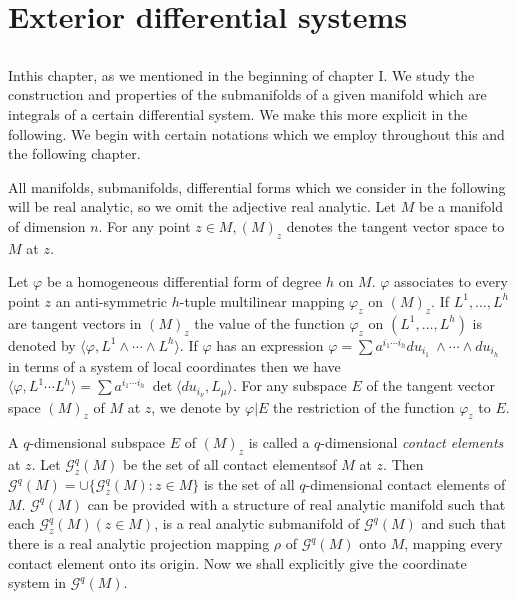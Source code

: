 
\chapter{Exterior differential systems}\label{chap2} %

\section{}\label{chap2:sec2.1} %

In\pageoriginale this chapter,  as we mentioned in the beginning of chapter I. We
study the construction and properties of the submanifolds of a given
manifold which are integrals of a certain differential system. We
make this more explicit in the following. We begin with certain
notations which we employ throughout this and the following chapter. 

All manifolds,  submanifolds,  differential forms which we consider in
the following will be real analytic,  so we omit the adjective real
analytic. Let $M$ be a manifold of dimension $n$. For any point $z \in
M,  (M)_z$ denotes the tangent vector space to $M$ at $z$. 

Let $\varphi$ be a homogeneous differential form of degree $h$ on
$M$. $\varphi$ associates to every point $z$ an anti-symmetric $h$-tuple
multilinear mapping $\varphi_z$ on $(M)_z$. If $L^1,  \ldots,  L^h$
are tangent vectors in $(M)_z$ the value of the function $\varphi_z$
on $(L^1,  \ldots,  L^h)$ is denoted by $\langle \varphi,  L^1 \wedge
\cdots \wedge L^h \rangle$. If $\varphi$ has an expression $\varphi =
\sum a^{i_1 \cdots i_h} du_{i_1} ~ \wedge \cdots \wedge du_{i_h}$ in
terms of a system of local coordinates then we have $\langle \varphi,
L^1 \cdots L^h \rangle = \sum a^{i_1 \cdots i_h} ~ \det \langle
du_{i_\nu},  L_\mu \rangle$. For any subspace $E$ of the tangent
vector space $(M)_z$ of $M$ at $z$,  we denote by $\varphi | E$ the
restriction of the function $\varphi_z$ to $E$. 

A $q$-dimensional subspace $E$ of $(M)_z$ is called a $q$-dimensional
\textit{contact elements} at $z$. Let $\mathscr{G}^q_z (M)$ be the set
of all contact elements\pageoriginale of $M$ at $z$. Then $\mathscr{G}^q(M) = \cup \{
\mathscr{G}^q_z (M) : z \in M\}$ is the set of all $q$-dimensional
contact elements of $M$. $\mathscr{G}^q(M)$ can be provided with a
structure of real analytic manifold such that each $\mathscr{G}^q_z
(M) (z \in M)$,  is a real analytic submanifold of $\mathscr{G}^q (M)$
and such that there is a real analytic projection mapping $\rho$ of
$\mathscr{G}^q(M)$ onto $M$,  mapping every contact element onto its
origin. Now we shall explicitly give the coordinate system in
$\mathscr{G}^q(M)$. 


